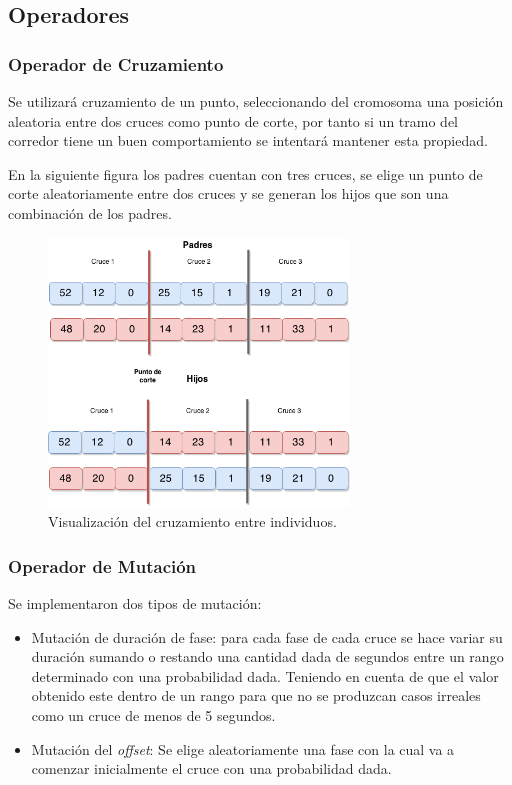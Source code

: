 \subsection{Operadores}
\subsubsection{Operador de Cruzamiento}
Se  utilizará cruzamiento de un punto, seleccionando del cromosoma una posición aleatoria entre dos cruces como punto de corte, por tanto si un tramo del corredor tiene un buen comportamiento se intentará mantener esta propiedad.

En la siguiente figura los padres cuentan con tres cruces, se elige un punto de corte aleatoriamente entre dos cruces y se generan los hijos que son una combinación de los padres.

\begin{figure}[H]
	\centering
	\includegraphics[width=8cm]{Figures/alg_cruzamiento}
	\caption{Visualización del cruzamiento entre individuos.}
	\label{fig:op_cruzamiento}
\end{figure}


\newpage
\subsubsection{Operador de Mutación}
Se implementaron dos tipos de mutación:
\begin{itemize}

\item Mutación de duración de fase: para cada fase de cada cruce se hace variar su duración sumando o restando una cantidad dada de segundos entre un rango determinado con una probabilidad dada. Teniendo en cuenta de que el valor obtenido este dentro de un rango para que no se produzcan casos irreales como un cruce de menos de 5 segundos.

\item Mutación del \emph{offset}: Se elige aleatoriamente una fase con la cual va a comenzar inicialmente el cruce con una probabilidad dada.
\end{itemize}





